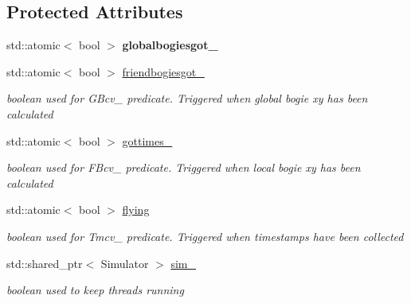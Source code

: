 \subsection*{Protected Attributes}
\begin{DoxyCompactItemize}
\item 
\mbox{\label{classBogiepos_a34000659627785c6540cb80859feb581}} 
std\+::atomic$<$ bool $>$ {\bfseries globalbogiesgot\+\_\+}
\item 
\mbox{\label{classBogiepos_a078da1e8c36879c4a7814f1871a0cda2}} 
std\+::atomic$<$ bool $>$ \hyperlink{classBogiepos_a078da1e8c36879c4a7814f1871a0cda2}{friendbogiesgot\+\_\+}
\begin{DoxyCompactList}\small\item\em boolean used for G\+Bcv\+\_\+ predicate. Triggered when global bogie xy has been calculated \end{DoxyCompactList}\item 
\mbox{\label{classBogiepos_a738345d6726997c8a7500ed98a9071d8}} 
std\+::atomic$<$ bool $>$ \hyperlink{classBogiepos_a738345d6726997c8a7500ed98a9071d8}{gottimes\+\_\+}
\begin{DoxyCompactList}\small\item\em boolean used for F\+Bcv\+\_\+ predicate. Triggered when local bogie xy has been calculated \end{DoxyCompactList}\item 
\mbox{\label{classBogiepos_ad4e826244556b74fb218b183a932cbf8}} 
std\+::atomic$<$ bool $>$ \hyperlink{classBogiepos_ad4e826244556b74fb218b183a932cbf8}{flying}
\begin{DoxyCompactList}\small\item\em boolean used for Tmcv\+\_\+ predicate. Triggered when timestamps have been collected \end{DoxyCompactList}\item 
\mbox{\label{classBogiepos_a41790cca77f5ae39cc10978f48faf22f}} 
std\+::shared\+\_\+ptr$<$ Simulator $>$ \hyperlink{classBogiepos_a41790cca77f5ae39cc10978f48faf22f}{sim\+\_\+}
\begin{DoxyCompactList}\small\item\em boolean used to keep threads running \end{DoxyCompactList}\item 

\end{DoxyCompactItemize}
